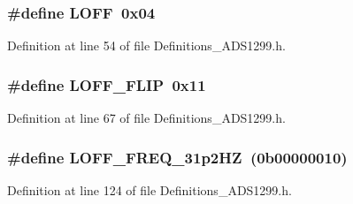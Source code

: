 \subsubsection[{\texorpdfstring{L\+O\+FF}{LOFF}}]{\setlength{\rightskip}{0pt plus 5cm}\#define L\+O\+FF~0x04}\hypertarget{group__Definitions__ADS1299_gabb4faa9cfd0d710c0b6311baf45f506f}{}\label{group__Definitions__ADS1299_gabb4faa9cfd0d710c0b6311baf45f506f}


Definition at line 54 of file Definitions\+\_\+\+A\+D\+S1299.\+h.

\subsubsection[{\texorpdfstring{L\+O\+F\+F\+\_\+\+F\+L\+IP}{LOFF_FLIP}}]{\setlength{\rightskip}{0pt plus 5cm}\#define L\+O\+F\+F\+\_\+\+F\+L\+IP~0x11}\hypertarget{group__Definitions__ADS1299_ga167c29fc8bc9fe36ff80fbab3aef76d0}{}\label{group__Definitions__ADS1299_ga167c29fc8bc9fe36ff80fbab3aef76d0}


Definition at line 67 of file Definitions\+\_\+\+A\+D\+S1299.\+h.

\subsubsection[{\texorpdfstring{L\+O\+F\+F\+\_\+\+F\+R\+E\+Q\+\_\+31p2\+HZ}{LOFF_FREQ_31p2HZ}}]{\setlength{\rightskip}{0pt plus 5cm}\#define L\+O\+F\+F\+\_\+\+F\+R\+E\+Q\+\_\+31p2\+HZ~(0b00000010)}\hypertarget{group__Definitions__ADS1299_ga39701cbaad5955197512c40d8bcc9da2}{}\label{group__Definitions__ADS1299_ga39701cbaad5955197512c40d8bcc9da2}


Definition at line 124 of file Definitions\+\_\+\+A\+D\+S1299.\+h.

